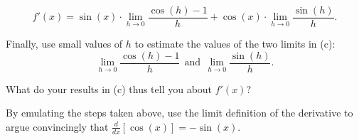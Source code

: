 \begin{exercises}
	$$f'(x) = \sin(x) \cdot \lim_{h \to 0} \frac{\cos(h) -1 }{h} + \cos(x) \cdot \lim_{h \to 0} \frac{\sin(h)}{h}.$$
	\item Finally, use small values of $h$ to estimate the values of the two limits in (c):
	$$\lim_{h \to 0} \frac{\cos(h) - 1}{h} \ \ \mbox{and} \ \ \lim_{h \to 0} \frac{\sin(h)}{h}.$$
	\item What do your results in (c) thus tell you about $f'(x)$?
	\item By emulating the steps taken above, use the limit definition of the derivative to argue convincingly that $\frac{d}{dx}[\cos(x)] = -\sin(x).$
\ea 
\end{exercises}
\afterexercises